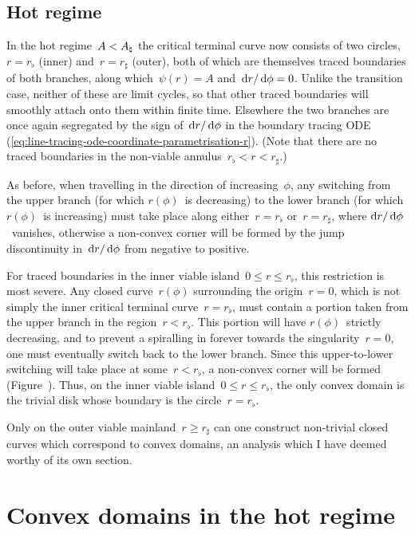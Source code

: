 \subsection{Hot regime}
\label{sec:polar.tracing.hot}

In the hot regime~$A < A_\natural$
the critical terminal curve now consists of two circles,
$r = r_\flat$ (inner) and~$r = r_\sharp$ (outer),
both of which are themselves traced boundaries of both branches,
along which~$\psi (r) = A$ and~$\mathop{}\!\mathrm{d} r / \mathop{}\!\mathrm{d}\phi = 0$.
Unlike the transition case,
neither of these are limit cycles,
so that other traced boundaries will smoothly attach onto them
within finite time.
Elsewhere the two branches are once again segregated
by the sign of~$\mathop{}\!\mathrm{d} r / \mathop{}\!\mathrm{d}\phi$ in the boundary tracing ODE~%
  (\ref{eq:line-tracing-ode-coordinate-parametrisation-r}).
(Note that there are no traced boundaries
in the non-viable annulus~$r_\flat < r < r_\sharp$.)

As before, when travelling in the direction of increasing~$\phi$,
any switching from the upper branch (for which $r (\phi)$~is decreasing)
to the lower branch (for which $r (\phi)$~is increasing)
must take place along either~$r = r_\flat$ or~$r = r_\sharp$,
where $\mathop{}\!\mathrm{d} r / \mathop{}\!\mathrm{d}\phi$~vanishes,
otherwise a non-convex corner will be formed
by the jump discontinuity in~$\mathop{}\!\mathrm{d} r / \mathop{}\!\mathrm{d}\phi$
from negative to positive.

For traced boundaries in the inner viable island~$0 \le r \le r_\flat$,
this restriction is most severe.
Any closed curve~$r (\phi)$ surrounding the origin~$r = 0$,
which is not simply the inner critical terminal curve~$r = r_\flat$,
must contain a portion taken from the upper branch
in the region~$r < r_\flat$.
This portion will have $r (\phi)$~strictly decreasing,
and to prevent a spiralling in forever
towards the singularity~$r = 0$,
one must eventually switch back to the lower branch.
Since this upper-to-lower switching will take place at some~$r < r_\flat$,
a non-convex corner will be formed
(Figure~\tbd).
Thus, on the inner viable island~$0 \le r \le r_\flat$,
the only convex domain is the trivial disk
whose boundary is the circle~$r = r_\flat$.

Only on the outer viable mainland~$r \ge r_\sharp$
can one construct non-trivial closed curves
which correspond to convex domains,
an analysis which I have deemed worthy of its own section.

\section{Convex domains in the hot regime}
\label{sec:line.convex}

